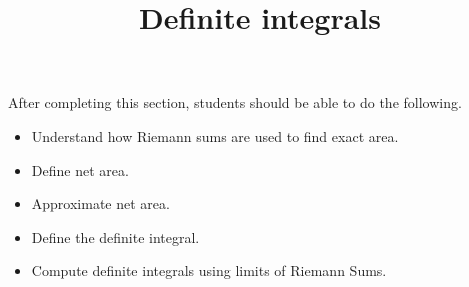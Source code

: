 \documentclass{ximera}
\title{Definite integrals}
\begin{document}
\begin{abstract}
\end{abstract}

\maketitle

\begin{sectionOutcomes}

After completing this section, students should be able to do the following.

\begin{itemize}
	\item Understand how Riemann sums are used to find exact area.
	\item Define net area.
	\item Approximate net area.
	\item Define the definite integral.
	\item Compute definite integrals using limits of Riemann Sums.	
\end{itemize}

\end{sectionOutcomes}
\end{document}
